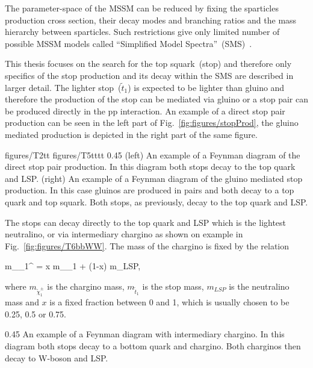 The parameter-space of the MSSM can be reduced by fixing the sparticles production cross section, their decay modes and branching ratios and the mass hierarchy between sparticles. Such restrictions give only limited number of possible MSSM models called ``Simplified Model Spectra''~(SMS)~\cite{Alves:2011wf, Alwall:2008ag, Chatrchyan:2013sza}.

This thesis focuses on the search for the top squark~(stop) and therefore only specifics of the stop production and its decay within the SMS are described in larger detail. The lighter stop~($\tilde{t}_{1}$) is expected to be lighter than gluino and therefore the production of the stop can be mediated via gluino or a stop pair can be produced directly in the pp interaction. An example of a direct stop pair production can be seen in the left part of Fig.~\ref{fig:figures/stopProd}, the gluino mediated production is depicted in the right part of the same figure.


                 {figures/T2tt}
                 {figures/T5tttt} %
                 {0.45}       %
                 {(left) An example of a Feynman diagram of the direct stop pair production. In this diagram both stops decay to the top quark and LSP. (right)  An example of a Feynman diagram of the gluino mediated stop production. In this case gluinos are produced in pairs and both decay to a top quark and top squark. Both stops, as previously, decay to the top quark and LSP. } %

The stops can decay directly to the top quark and LSP which is the lightest neutralino, or via intermediary chargino as shown on example in Fig.~\ref{fig:figures/T6bbWW}. The mass of the chargino is fixed by the relation

{
m_{\tilde{\chi}_{1}^{\pm}} = x m_{_{1}} + (1-x) m_{LSP},
}

where $m_{\tilde{\chi}_{1}^{\pm}}$ is the chargino mass, $m_{\tilde{t}_{1}}$ is the stop mass, $m_{LSP}$ is the neutralino mass and $x$ is a fixed fraction between 0 and 1, which is usually chosen to be 0.25, 0.5 or 0.75. 

                 {0.45}       %
                 {An example of a Feynman diagram with intermediary chargino. In this diagram both stops decay to a bottom quark and chargino. Both charginos then decay to W-boson and LSP.   } %

